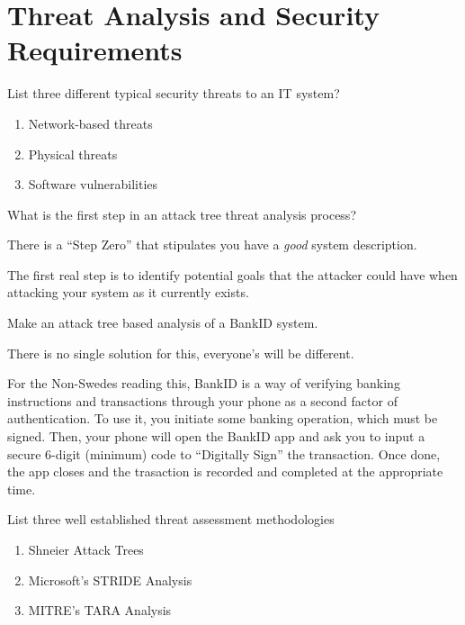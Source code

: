 \section{Threat Analysis and Security Requirements}\label{sec:Threat_Analysis-Security_Requirements}
\begin{questions}
\question{} List three different typical security threats to an IT system?
  \begin{solution}
    \begin{enumerate}[noitemsep]
    \item Network-based threats
    \item Physical threats
    \item Software vulnerabilities
    \end{enumerate}
  \end{solution}

\question{} What is the first step in an attack tree threat analysis process?
  \begin{solution}
    There is a ``Step Zero'' that stipulates you have a \emph{good} system description.

    The first real step is to identify potential goals that the attacker could have when attacking your system as it currently exists.
  \end{solution}

\question{} Make an attack tree based analysis of a BankID system.
  \begin{solution}
    There is no single solution for this, everyone's will be different.

    For the Non-Swedes reading this, BankID is a way of verifying banking instructions and transactions through your phone as a second factor of authentication.
    To use it, you initiate some banking operation, which must be signed.
    Then, your phone will open the BankID app and ask you to input a secure 6-digit (minimum) code to ``Digitally Sign'' the transaction.
    Once done, the app closes and the trasaction is recorded and completed at the appropriate time.
  \end{solution}

\question{} List three well established threat assessment methodologies
  \begin{solution}
    \begin{enumerate}[noitemsep]
    \item Shneier Attack Trees
    \item Microsoft's STRIDE Analysis
    \item MITRE's TARA Analysis
    \end{enumerate}
  \end{solution}


\end{questions}
